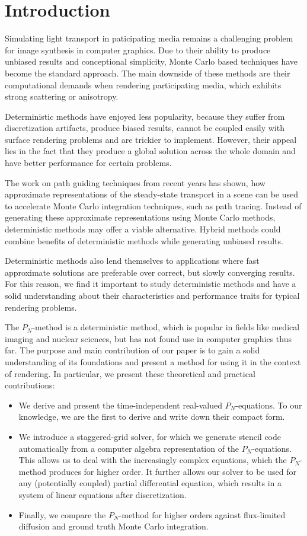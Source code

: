 \section{Introduction}

Simulating light transport in paticipating media remains a challenging problem for image synthesis in computer graphics. Due to their ability to produce unbiased results and conceptional simplicity, Monte Carlo based techniques have become the standard approach. The main downside of these methods are their computational demands when rendering participating media, which exhibits strong scattering or anisotropy.

Deterministic methods have enjoyed less popularity, because they suffer from discretization artifacts, produce biased results, cannot be coupled easily with surface rendering problems and are trickier to implement. However, their appeal lies in the fact that they produce a global solution across the whole domain and have better performance for certain problems.

The work on path guiding techniques from recent years has shown, how approximate representations of the steady-state transport in a scene can be used to accelerate Monte Carlo integration techniques, such as path tracing. Instead of generating these approximate representations using Monte Carlo methods, deterministic methods may offer a viable alternative. Hybrid methods could combine benefits of deterministic methods while generating unbiased results.

Deterministic methods also lend themselves to applications where fast approximate solutions are preferable over correct, but slowly converging results. For this reason, we find it important to study deterministic methods and have a solid understanding about their characteristics and performance traits for typical rendering problems.

The $P_N$-method is a deterministic method, which is popular in fields like medical imaging and nuclear sciences, but has not found use in computer graphics thus far. The purpose and main contribution of our paper is to gain a solid understanding of its foundations and present a method for using it in the context of rendering. In particular, we present these theoretical and practical contributions:
\begin{itemize}
	\item We derive and present the time-independent real-valued $P_N$-equations. To our knowledge, we are the first to derive and write down their compact form.
	\item We introduce a staggered-grid solver, for which we generate stencil code automatically from a computer algebra representation of the $P_N$-equations. This allows us to deal with the increasingly complex equations, which the $P_N$-method produces for higher order. It further allows our solver to be used for any (potentially coupled) partial differential equation, which results in a system of linear equations after discretization.
	\item Finally, we compare the $P_N$-method for higher orders against flux-limited diffusion and ground truth Monte Carlo integration.
\end{itemize}


